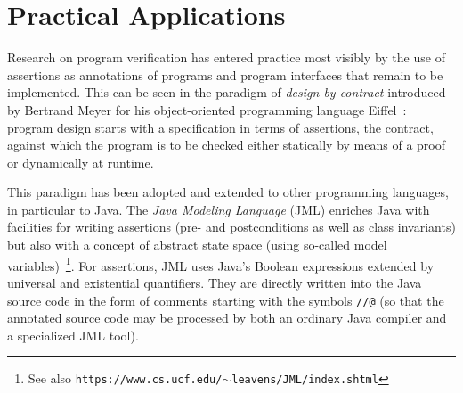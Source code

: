 \documentclass[runningheads]{llncs}       %
\begin{document}



\section{Practical Applications}

Research on program verification has entered practice most visibly by
the use of assertions as annotations of programs and program
interfaces that remain to be implemented.  This can be seen in the
paradigm of \emph{design by contract} introduced by Bertrand Meyer for
his object-oriented programming language Eiffel~\cite{Mey97}: program
design starts with a specification in terms of assertions, the
contract, against which the program is to be checked either statically
by means of a proof or dynamically at runtime.

This paradigm has been adopted and extended to other programming
languages, in particular to Java.
The \emph{Java Modeling Language} (JML) enriches Java with facilities for 
writing assertions (pre- and postconditions as well as 
class invariants) but also with a concept of abstract state space 
(using so-called model variables)~\cite{JML05}\footnote{See also
  \texttt{https://www.cs.ucf.edu/$\sim$leavens/JML/index.shtml}}.
For assertions, JML uses Java’s Boolean expressions extended by
universal and existential quantifiers. 
They are directly written into the Java source code in the form of comments 
starting with the symbols \texttt{//@}
(so that the annotated source code may be processed by both an ordinary Java compiler 
and a specialized JML tool). 
\end{document}
